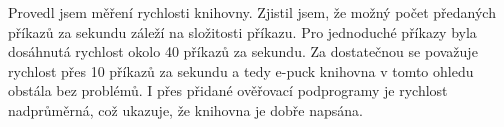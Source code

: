     Provedl jsem měření rychlosti knihovny. Zjistil jsem, že možný
    počet předaných příkazů za sekundu záleží na složitosti příkazu.
    Pro jednoduché příkazy byla dosáhnutá rychlost okolo 40 příkazů za sekundu.
    Za dostatečnou se považuje rychlost přes 10 příkazů za sekundu a tedy
    e-puck knihovna v tomto ohledu obstála bez problémů. I přes přidané
    ověřovací podprogramy je rychlost nadprůměrná, což ukazuje, že knihovna je
    dobře napsána.
